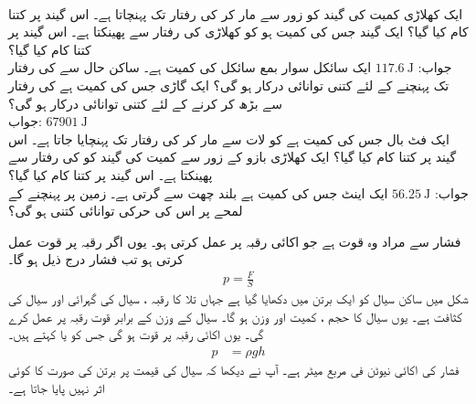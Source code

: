  \\
ایک کھلاڑی  کمیت کی گیند کو زور سے  مار کر  کی رفتار تک پہنچاتا ہے۔ اس گیند پر کتنا کام کیا گیا؟ 
ایک گیند جس کی کمیت  ہو کو کھلاڑی  کی رفتار سے  پھینکتا ہے۔ اس گیند پر کتنا کام کیا گیا؟\\
جواب:\quad
$\SI{117.6}{\joule}$
ایک سائکل سوار بمع سائکل کی کمیت  ہے۔ ساکن حال سے  کی رفتار تک پہنچنے کے لئے کتنی توانائی درکار ہو گی؟
ایک گاڑی جس کی کمیت  ہے کی رفتار  سے بڑھ کر  کرنے کے لئے کتنی توانائی درکار ہو گی؟\\
جواب:\quad
$\SI{67901}{\joule}$
\\
ایک فٹ بال جس کی کمیت  ہے کو لات سے مار  کر  کی رفتار تک پہنچایا جاتا ہے۔ اس گیند پر کتنا کام کیا گیا؟
ایک کھلاڑی بازو کے زور سے  کمیت کی گیند کو  کی رفتار سے پھینکتا ہے۔ اس گیند پر کتنا کام کیا گیا؟\\
جواب:\quad
$\SI{56.25}{\joule}$
ایک اینٹ جس کی کمیت  ہے  بلند چھت سے گرتی ہے۔ زمین پر پہنچنے کے لمحے پر اس کی حرکی توانائی کتنی ہو گی؟

فشار  سے مراد وہ قوت ہے جو اکائی رقبہ پر عمل کرتی ہو۔ یوں اگر رقبہ  پر قوت  عمل کرتی ہو تب فشار  درج ذیل ہو گا۔
\begin{align}\label{مساوات_تکمل_استعمال_فشار_اور_قوت}
p=\frac{F}{S}
\end{align}
 شکل  میں ساکن سیال کو ایک برتن میں دکھایا گیا ہے جہاں تلا کا رقبہ ، سیال کی گہرائی  اور  سیال کی کثافت  ہے۔ یوں سیال کا حجم ،  کمیت  اور وزن  ہو گا۔ سیال کے وزن کے برابر قوت  رقبہ  پر عمل کرے گی۔ یوں اکائی رقبہ پر قوت  ہو گی جس کو   یا   کہتے ہیں۔
\begin{align}\label{مساوات_تکمل_استعمال_فشار_سیال_الف}
p&=\rho g h
\end{align}
فشار کی اکائی  نیوٹن فی مربع میٹر  ہے۔ آپ نے دیکھا کہ سیال کی قیمت پر برتن کی صورت کا کوئی اثر نہیں پایا جاتا ہے۔

